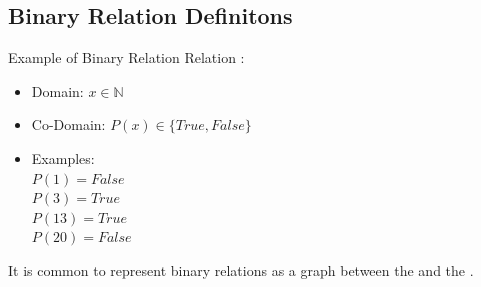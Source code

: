 \subsection{Binary Relation Definitons}

\begin{frame}[t]{Example of Binary Relation}
  Relation :\bigskip

  \begin{itemize}
  \item Domain: $x \in \mathbb{N}$
  \item Co-Domain: $P(x) \in \{True, False\}$ 
  \item Examples:\\ $P(1) = False$\\ $P(3) = True$\\$P(13) = True$\\$P(20) = False$
  \end{itemize}\bigskip 

  It is common to represent binary relations as a graph between the  and the .


\end{frame}

